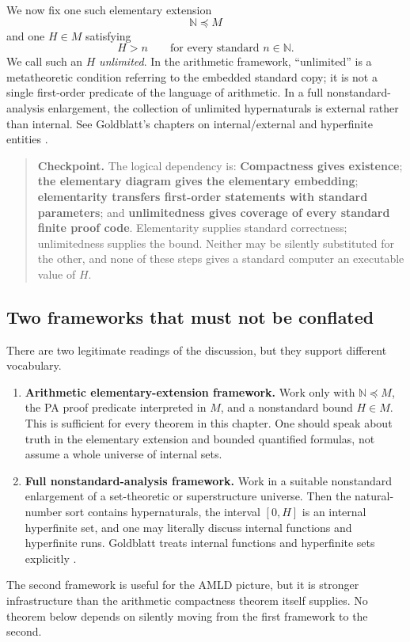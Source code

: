 \documentclass[11pt,openany]{book}
\theoremstyle{definition}
\theoremstyle{remark}
\newenvironment{checkpoint}{\begin{quote}\small\color{black}\textbf{Checkpoint.} }{\end{quote}}
\newcommand{\N}{\mathbb{N}}
\begin{document}
We now fix one such elementary extension
\[
\N\preccurlyeq M
\]
and one \(H\in M\) satisfying
\[
H>n\qquad\text{for every standard }n\in\N.
\]
We call such an \(H\) \emph{unlimited}. In the arithmetic framework, ``unlimited'' is a metatheoretic condition referring to the embedded standard copy; it is not a single first-order predicate of the language of arithmetic. In a full nonstandard-analysis enlargement, the collection of unlimited hypernaturals is external rather than internal. See Goldblatt's chapters on internal/external and hyperfinite entities \cite{GoldblattHyperreals}.

\begin{checkpoint}
The logical dependency is: \textbf{Compactness gives existence}; \textbf{the elementary diagram gives the elementary embedding}; \textbf{elementarity transfers first-order statements with standard parameters}; and \textbf{unlimitedness gives coverage of every standard finite proof code}. Elementarity supplies standard correctness; unlimitedness supplies the bound. Neither may be silently substituted for the other, and none of these steps gives a standard computer an executable value of \(H\).
\end{checkpoint}

\subsection{Two frameworks that must not be conflated}\label{sec:two-nsa-frameworks}
There are two legitimate readings of the discussion, but they support different vocabulary.
\begin{enumerate}
\item \textbf{Arithmetic elementary-extension framework.} Work only with \(\N\preccurlyeq M\), the PA proof predicate interpreted in \(M\), and a nonstandard bound \(H\in M\). This is sufficient for every theorem in this chapter. One should speak about truth in the elementary extension and bounded quantified formulas, not assume a whole universe of internal sets.
\item \textbf{Full nonstandard-analysis framework.} Work in a suitable nonstandard enlargement of a set-theoretic or superstructure universe. Then the natural-number sort contains hypernaturals, the interval \([0,H]\) is an internal hyperfinite set, and one may literally discuss internal functions and hyperfinite runs. Goldblatt treats internal functions and hyperfinite sets explicitly \cite{GoldblattHyperreals}.
\end{enumerate}
The second framework is useful for the AMLD picture, but it is stronger infrastructure than the arithmetic compactness theorem itself supplies. No theorem below depends on silently moving from the first framework to the second.
\end{document}

